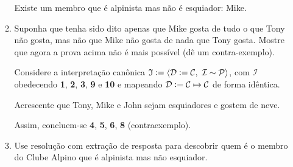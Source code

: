 \documentclass[10pt, twoside]{article}          %
\let\oldphantom\vphantom
\let\vphantom\relax
\let\vphantom\oldphantom
\newcommand{\defeq}{\vcentcolon=}               %
\renewcommand{\l}{\mathopen{}\left}             %
\renewcommand{\r}{\vphantom{1j}\right}          %
\newenvironment{proof*}[1][proof*]              %
  {\proof[#1]\vspace{0.5em}\vspace*{-\baselineskip}
  \hspace{\parindent}\leftskip=.5cm\rightskip=.5cm}
  {\vspace*{-1.5\baselineskip}
  
  \rightskip=0cm\endproof}
\begin{document}
\begin{multicols*}{2}
\begin{enumerate}
\begin{proof*}[\unskip\nopunct]
\begin{enumerate}
        Existe um membro que é alpinista mas não é esquiador: Mike.

      \item Suponha que tenha sido dito apenas que Mike gosta de tudo o que Tony não gosta, mas não 
      que Mike não gosta de nada que Tony gosta. Mostre que agora a prova acima não é mais possível 
      (dê um contra-exemplo).

        Considere a interpretação canônica $\mathfrak{I}\defeq
        \l\langle\mathcal{D}\defeq\mathcal{C},\ \mathcal{I}\sim\mathcal{P}\r\rangle$, com 
        $\mathcal{I}$ obedecendo \textbf{1}, \textbf{2}, \textbf{3}, \textbf{9} e \textbf{10} e 
        mapeando $\mathcal{D}\defeq\mathcal{C}\mapsto\mathcal{C}$ de forma idêntica.

        Acrescente que Tony, Mike e John sejam esquiadores e gostem de neve.

        Assim, concluem-se \textbf{4}, \textbf{5}, \textbf{6}, \textbf{8} (contraexemplo).

      \item Use resolução com extração de resposta para descobrir quem é o membro do Clube Alpino 
      que é alpinista mas não esquiador.


\end{enumerate}
\end{proof*}
\end{enumerate}
\end{multicols*}
\end{document}
